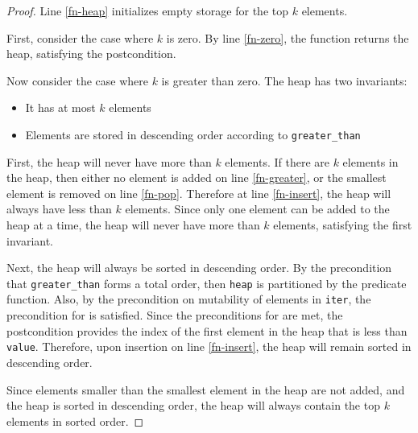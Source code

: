 \documentclass{article}
\begin{document}
\begin{proof}
    Line \ref{fn-heap} initializes empty storage for the top $k$ elements.

    First, consider the case where $k$ is zero.
    By line \ref{fn-zero}, the function returns the heap, satisfying the postcondition.

    Now consider the case where $k$ is greater than zero.
    The heap has two invariants:
    \begin{itemize}
        \item It has at most $k$ elements
        \item Elements are stored in descending order according to \texttt{greater\_than}
    \end{itemize}

    First, the heap will never have more than $k$ elements.
    If there are $k$ elements in the heap, then either no element is added on line \ref{fn-greater},
    or the smallest element is removed on line \ref{fn-pop}.
    Therefore at line \ref{fn-insert}, the heap will always have less than $k$ elements.
    Since only one element can be added to the heap at a time, the heap will never have more than $k$ elements,
    satisfying the first invariant.

    Next, the heap will always be sorted in descending order.
    By the precondition that \texttt{greater\_than} forms a total order,
    then \texttt{heap} is partitioned by the predicate function.
    Also, by the precondition on mutability of elements in \texttt{iter}, 
    the precondition for  is satisfied.
    Since the preconditions for  are met,
    the postcondition provides the index of the first element in the heap that is less than \texttt{value}.
    Therefore, upon insertion on line \ref{fn-insert}, the heap will remain sorted in descending order.

    Since elements smaller than the smallest element in the heap are not added,
    and the heap is sorted in descending order,
    the heap will always contain the top $k$ elements in sorted order.
\end{proof}
\end{document}
